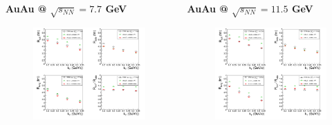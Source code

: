 \documentclass[dvipsnames] {beamer}
\begin{document}
\begin{frame}[shrink=50]
  \begin{columns}
    \begin{block}{\bf \centering AuAu @ $\sqrt{s_{NN}} = 7.7$ GeV}
       \begin{figure}[H]
         \includegraphics[width=.95\linewidth]{radii_077gev_STAR_vs_kT.png}
       \end{figure}
    \end{block}
    \begin{block}{\bf \centering AuAu @ $\sqrt{s_{NN}} = 11.5$ GeV}
       \begin{figure}[H]
         \includegraphics[width=.95\linewidth]{radii_115gev_STAR_vs_kT.png}

\end{figure}
\end{block}
\end{columns}
\end{frame}
\end{document}
